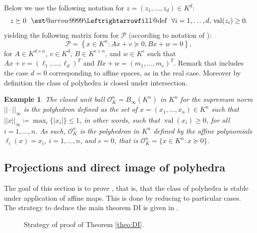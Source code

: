 \documentclass[sigconf]{acmart}
\makeatletter
\newcommand\xleftrightarrow[2][]{%
  \ext@arrow 9999{\Leftrightarrowfill@}{#1}{#2}}
\newcommand{\PP}{\mathcal{P}}
\newtheorem{example}[theorem]{Example}
\DeclareMathOperator{\val}{val}
\newcommand{\OK}{\mathcal{O}_K}
\makeatother
\begin{document}
Below we use the following notation for $z = (z_1,\ldots,z_d) \in K^d$:
$$
z \succeq 0
\,\,\,\,
\xleftrightarrow{\text{def}}
\,\,\,\,
\forall i=1,\ldots,d, \, \val(z_i)\geq 0.
$$
yielding the following matrix form for $\PP$ (according to notation of
):
\begin{equation}\label{eq_def_polyhedra_compact}
  \PP = \left\lbrace x \in K^n : Ax+v \succeq 0, Bx+w = 0 \right\rbrace,
\end{equation}
for $A \in K^{d \times n}$, $v \in K^d$, $B \in K^{e \times n}$, and
$w \in K^e$ such that $Ax+v = (\ell_1,\ldots,\ell_d)^T$
and $Bx+w = (m_1,\ldots,m_e)^T$.
Remark that  includes the case $d=0$ corresponding to affine spaces, as in the real case.
Moreover by definition the class of polyhedra is closed under intersection.

\begin{example}
  The {closed unit ball} $\OK^n=B_\infty(K^n)$ in $K^n$ for the supremum norm $||\cdot||_{\infty}$ is the
  polyhedron defined as the set of $x=(x_1,\ldots,x_n) \in K^n$ such that $||x||_{\infty} \coloneq
  \max_i\{\vert x_i \vert\} \leq 1$, in other words, such that $\val(x_i) \geq 0$, for all $i=1, \ldots, n$.
  As such, $\OK^n$ is the polyhedron in $K^n$ defined by the affine polynomials
  $\ell_i(x)=x_i$, $i=1,\ldots, n$, and $e=0$, that is $\OK^n = \{x \in K^n : x \succeq 0\}$.
\end{example}

\subsection{Projections and direct image of polyhedra}
\label{ssec:projections}
The goal of this section is to prove , that is, that
the class of polyhedra is stable under application of affine maps. This is done
by reducing to particular cases. The strategy to deduce the main theorem DI 
is given in .

\begin{figure}[!ht] 
\centering
{}
\caption{Strategy of proof of Theorem \ref{theo:DI}.}
\label{fig:di-properties}
\end{figure}
\end{document}
